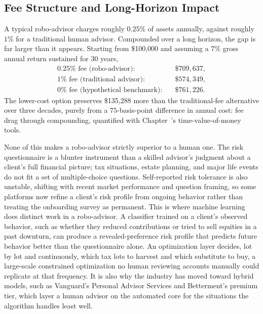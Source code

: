 \documentclass[../ai_in_finance]{subfiles}
\begin{document}
\subsection{Fee Structure and Long-Horizon Impact}
\label{sec:robo-fees}

A typical robo-advisor charges roughly $0.25\%$ of assets annually, against roughly $1\%$ for a traditional human advisor. Compounded over a long horizon, the gap is far larger than it appears. Starting from \$100,000 and assuming a $7\%$ gross annual return sustained for $30$ years,
\begin{align*}
0.25\% \text{ fee (robo-advisor):} &\quad \$709{,}637, \\
1\% \text{ fee (traditional advisor):} &\quad \$574{,}349, \\
0\% \text{ fee (hypothetical benchmark):} &\quad \$761{,}226.
\end{align*}
The lower-cost option preserves \$135,288 more than the traditional-fee alternative over three decades, purely from a $75$-basis-point difference in annual cost: fee drag through compounding, quantified with Chapter~'s time-value-of-money tools.

None of this makes a robo-advisor strictly superior to a human one. The risk questionnaire is a blunter instrument than a skilled advisor's judgment about a client's full financial picture; tax situations, estate planning, and major life events do not fit a set of multiple-choice questions. Self-reported risk tolerance is also unstable, shifting with recent market performance and question framing, so some platforms now refine a client's risk profile from ongoing behavior rather than treating the onboarding survey as permanent.
This is where machine learning does distinct work in a robo-advisor. A classifier trained on a client's observed behavior, such as whether they reduced contributions or tried to sell equities in a past downturn, can produce a revealed-preference risk profile that predicts future behavior better than the questionnaire alone. An optimization layer decides, lot by lot and continuously, which tax lots to harvest and which substitute to buy, a large-scale constrained optimization no human reviewing accounts manually could replicate at that frequency.
It is also why the industry has moved toward hybrid models, such as Vanguard's Personal Advisor Services and Betterment's premium tier, which layer a human advisor on the automated core for the situations the algorithm handles least well.
\end{document}

